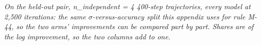 \documentclass[10pt]{article}
\begin{document}
\begin{center}\small{}\end{center}

\emph{On the held-out pair, n\_independent = 4 400-step trajectories, every model at 2,500 iterations: the same $\sigma$-versus-accuracy split this appendix uses for rule M-44, so the two arms' improvements can be compared part by part. Shares are of the log improvement, so the two columns add to one.}
\end{document}
